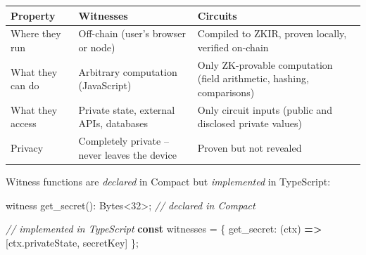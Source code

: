 \documentclass[
  11pt,
  openany]{report}
\newenvironment{Shaded}{\begin{snugshade}}{\end{snugshade}}
\newcommand{\AttributeTok}[1]{\textcolor[rgb]{0.75,0.60,1.00}{#1}}
\newcommand{\CommentTok}[1]{\textcolor[rgb]{0.50,0.54,0.62}{\textit{#1}}}
\newcommand{\DataTypeTok}[1]{\textcolor[rgb]{0.75,0.60,1.00}{#1}}
\newcommand{\DecValTok}[1]{\textcolor[rgb]{0.91,0.66,0.43}{#1}}
\newcommand{\FunctionTok}[1]{\textcolor[rgb]{0.49,0.78,0.89}{#1}}
\newcommand{\KeywordTok}[1]{\textcolor[rgb]{0.62,0.65,1.00}{\textbf{#1}}}
\newcommand{\NormalTok}[1]{\textcolor[rgb]{0.78,0.80,0.85}{#1}}
\newcommand{\OperatorTok}[1]{\textcolor[rgb]{0.78,0.80,0.85}{#1}}
\renewcommand{\textbf}[1]{{\bfseries\color{MidnightBold}#1}}
\renewenvironment{Shaded}{%
  \begin{tcolorbox}[
    colback=MidnightCode,
    colframe=MidnightBorder,
    arc=4pt,
    boxrule=0.5pt,
    left=8pt, right=8pt, top=6pt, bottom=6pt,
    breakable, enhanced
  ]%
}{\end{tcolorbox}}
\begin{document}
\begin{longtable}[]{@{}
  >{\raggedright\arraybackslash}p{}
  >{\raggedright\arraybackslash}p{}
  >{\raggedright\arraybackslash}p{}@{}}
\toprule\noalign{}
\begin{minipage}[b]{\linewidth}\raggedright
Property
\end{minipage} & \begin{minipage}[b]{\linewidth}\raggedright
Witnesses
\end{minipage} & \begin{minipage}[b]{\linewidth}\raggedright
Circuits
\end{minipage} \\
\midrule\noalign{}
\arrayrulecolor{MidnightBlue}\midrule\arrayrulecolor{MidnightBorder}
\endhead
\bottomrule\noalign{}
\endlastfoot
Where they run & Off-chain (user's browser or node) & Compiled to ZKIR, proven
locally, verified on-chain \\
What they can do & Arbitrary computation (JavaScript) & Only ZK-provable
computation (field arithmetic, hashing, comparisons) \\
What they access & Private state, external APIs, databases & Only circuit inputs
(public and disclosed private values) \\
Privacy & Completely private -- never leaves the device & Proven but not
revealed \\
\end{longtable}

Witness functions are \emph{declared} in Compact but \emph{implemented} in
TypeScript:

\begin{Shaded}
\begin{Highlighting}[]
\NormalTok{witness }\FunctionTok{get\_secret}\NormalTok{()}\OperatorTok{:}\NormalTok{ Bytes}\OperatorTok{\textless{}}\DecValTok{32}\OperatorTok{\textgreater{};}  \CommentTok{// declared in Compact}
\end{Highlighting}
\end{Shaded}

\begin{Shaded}
\begin{Highlighting}[]
\CommentTok{// implemented in TypeScript}
\KeywordTok{const}\NormalTok{ witnesses }\OperatorTok{=}\NormalTok{ \{}
  \DataTypeTok{get\_secret}\OperatorTok{:}\NormalTok{ (ctx) }\KeywordTok{=\textgreater{}}\NormalTok{ [ctx}\OperatorTok{.}\AttributeTok{privateState}\OperatorTok{,}\NormalTok{ secretKey]}
\NormalTok{\}}\OperatorTok{;}
\end{Highlighting}
\end{Shaded}
\end{document}
